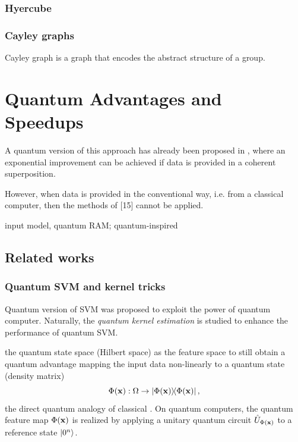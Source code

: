 \subsubsection{Hyercube}
\subsubsection{Cayley graphs}
\begin{definition}\label{def:cayley_graph}
	Cayley graph is a graph that encodes the abstract structure of a group. 
\end{definition}

\section{Quantum Advantages and Speedups}\label{sec:speedup}
A quantum version of this approach has already been proposed in \cite{rebentrostQuantumSupportVector2014},
where an exponential improvement can be achieved if data is provided in a coherent superposition. 
\begin{remark}
	However, when data is provided in the conventional way, i.e. from a classical computer, then the methods of [15] cannot be applied.
\end{remark}
input model, quantum RAM;
quantum-inspired \cite{tangQuantuminspiredClassicalAlgorithm2019}

\subsection{Related works}\label{sec:qke}

\subsubsection{Quantum SVM and kernel tricks}
Quantum version of SVM was proposed \cite{rebentrostQuantumSupportVector2014} to exploit the power of quantum computer.
Naturally, the \emph{quantum kernel estimation}
\cite{schuldQuantumMachineLearning2019}
\cite{havlicekSupervisedLearningQuantum2019} 
is studied to enhance the performance of quantum SVM.
\begin{definition}\label{def:quantum_feature_map}
	the quantum state space (Hilbert space) as the feature space to still obtain a quantum advantage
	mapping the input data non-linearly to a quantum state (density matrix) 
	\begin{equation}
		\Phi(\vbx): \Omega \to \dyad{\Phi(\vbx)},
		\label{eq:quantum_feature_map}
	\end{equation}
	the direct quantum analogy of classical .
	On quantum computers, the quantum feature map $\Phi(\vb{x})$ is realized by applying a unitary quantum circuit $\hat{U}_{\Phi(\vb{x})}$ to a reference state $\ket{0^n}$.
\end{definition}

